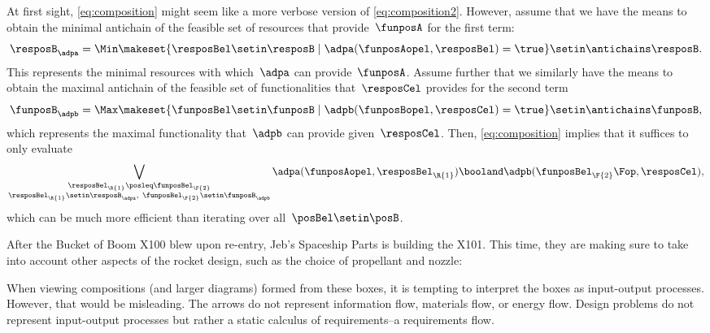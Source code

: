 \begin{remark}
    At first sight, \cref{eq:composition} might seem like a more verbose version of \cref{eq:composition2}.
    However, assume that we have the means to obtain the minimal antichain of the feasible set of resources that provide~$\funposA$ for the first term:
    \begin{equation}
        \resposB_\adpa = \Min \makeset{\resposBel\setin \resposB \mid \adpa(\funposAopel,\resposBel)=\true} \setin \antichains \resposB.
    \end{equation}
    This represents the minimal resources with which~$\adpa$ can provide~$\funposA$.
    Assume further that we similarly have the means to obtain the maximal antichain of the feasible set of functionalities that~$\resposCel$ provides for the second term
    \begin{equation}
        \funposB_\adpb = \Max \makeset{\funposBel\setin \funposB \mid \adpb(\funposBopel,\resposCel)=\true} \setin \antichains \funposB,
    \end{equation}
    which represents the maximal functionality that~$\adpb$ can provide given~$\resposCel$.
    Then, \cref{eq:composition} implies that it suffices to only evaluate
    \begin{equation}
        \bigvee_{\substack{\resposBel_\R{1}\posleq\funposBel_\F{2} \\ \resposBel_\R{1}\setin \resposB_\adpa,~ \funposBel_\F{2}\setin\funposB_\adpb }} \adpa(\funposAopel,\resposBel_\R{1}) \booland \adpb(\funposBel_\F{2}\Fop,\resposCel),
    \end{equation}
    which can be much more efficient than iterating over all~$\posBel\setin \posB$.
\end{remark}



\begin{example}
    After the Bucket of Boom X100 blew upon re-entry, Jeb's Spaceship Parts is building the X101.
    This time, they are making sure to take into account other aspects of the rocket design, such as the choice of propellant and nozzle:
\end{example}

\begin{remark}
    When viewing compositions (and larger diagrams) formed from these boxes, it is tempting to interpret the boxes as input-output processes.
    However, that would be misleading.
    The arrows do not represent information flow, materials flow, or energy flow.
    Design problems do not represent input-output processes but rather a static calculus of requirements--a requirements flow.
\end{remark}

